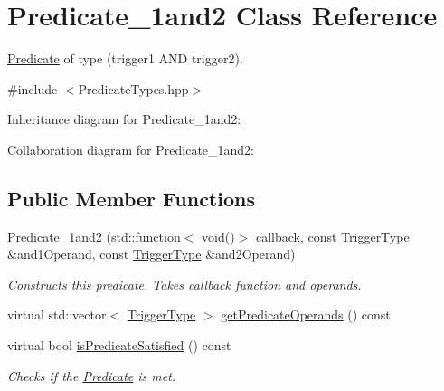 \hypertarget{classPredicate__1and2}{}\section{Predicate\+\_\+1and2 Class Reference}
\label{classPredicate__1and2}


\hyperlink{classPredicate}{Predicate} of type (trigger1 A\+ND trigger2).  




{\ttfamily \#include $<$Predicate\+Types.\+hpp$>$}



Inheritance diagram for Predicate\+\_\+1and2\+:


Collaboration diagram for Predicate\+\_\+1and2\+:
\subsection*{Public Member Functions}
\begin{DoxyCompactItemize}
\item 
\hyperlink{classPredicate__1and2_a7fad2d370e96c46d9bcf2bb325c084cb}{Predicate\+\_\+1and2} (std\+::function$<$ void()$>$ callback, const \hyperlink{structTriggerType}{Trigger\+Type} \&and1\+Operand, const \hyperlink{structTriggerType}{Trigger\+Type} \&and2\+Operand)\hypertarget{classPredicate__1and2_a7fad2d370e96c46d9bcf2bb325c084cb}{}\label{classPredicate__1and2_a7fad2d370e96c46d9bcf2bb325c084cb}

\begin{DoxyCompactList}\small\item\em Constructs this predicate. Takes callback function and operands. \end{DoxyCompactList}\item 
virtual std\+::vector$<$ \hyperlink{structTriggerType}{Trigger\+Type} $>$ \hyperlink{classPredicate__1and2_ab9c037b965689cf9d06448632bee3cb1}{get\+Predicate\+Operands} () const 
\item 
virtual bool \hyperlink{classPredicate__1and2_a40454b823fe2c0d9dce1501b85050cef}{is\+Predicate\+Satisfied} () const \hypertarget{classPredicate__1and2_a40454b823fe2c0d9dce1501b85050cef}{}\label{classPredicate__1and2_a40454b823fe2c0d9dce1501b85050cef}

\begin{DoxyCompactList}\small\item\em Checks if the \hyperlink{classPredicate}{Predicate} is met. \end{DoxyCompactList}\end{DoxyCompactItemize}
